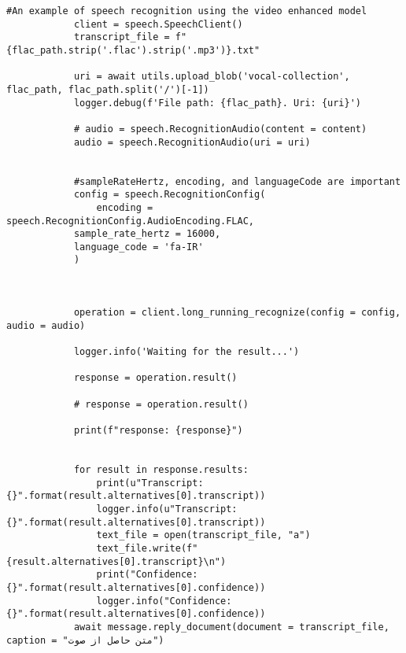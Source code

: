 \documentclass{article}
\begin{document}
\begin{verbatim}
#An example of speech recognition using the video enhanced model
            client = speech.SpeechClient()    
            transcript_file = f"{flac_path.strip('.flac').strip('.mp3')}.txt"

            uri = await utils.upload_blob('vocal-collection', flac_path, flac_path.split('/')[-1]) 
            logger.debug(f'File path: {flac_path}. Uri: {uri}')

            # audio = speech.RecognitionAudio(content = content)
            audio = speech.RecognitionAudio(uri = uri)
            

            #sampleRateHertz, encoding, and languageCode are important
            config = speech.RecognitionConfig(                        
                encoding = speech.RecognitionConfig.AudioEncoding.FLAC,
            sample_rate_hertz = 16000,
            language_code = 'fa-IR'
            )

            

            operation = client.long_running_recognize(config = config, audio = audio)

            logger.info('Waiting for the result...')
            
            response = operation.result()

            # response = operation.result()

            print(f"response: {response}")


            for result in response.results:
                print(u"Transcript: {}".format(result.alternatives[0].transcript))
                logger.info(u"Transcript: {}".format(result.alternatives[0].transcript))
                text_file = open(transcript_file, "a")
                text_file.write(f"{result.alternatives[0].transcript}\n")
                print("Confidence: {}".format(result.alternatives[0].confidence))
                logger.info("Confidence: {}".format(result.alternatives[0].confidence))
            await message.reply_document(document = transcript_file, caption = "متن حاصل از صوت")

\end{verbatim}
\end{document}
